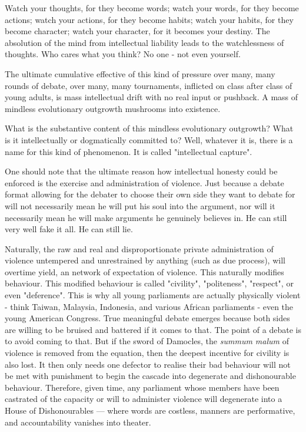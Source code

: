 \begin{itemize}
Watch your thoughts, for they become words; watch your words, for they become actions; watch your actions, for they become habits; watch your habits, for they become character; watch your character, for it becomes your destiny. The absolution of the mind from intellectual liability leads to the watchlessness of thoughts. Who cares what you think? No one - not even yourself. 
    
The ultimate cumulative effective of this kind of pressure over many, many rounds of debate, over many, many tournaments, inflicted on class after class of young adults, is mass intellectual drift with no real input or pushback. A mass of mindless evolutionary outgrowth mushrooms into existence. 

What is the substantive content of this mindless evolutionary outgrowth? What is it intellectually or dogmatically committed to? Well, whatever it is, there is a name for this kind of phenomenon. It is called "intellectual capture".

One should note that the ultimate reason how intellectual honesty could be enforced is the exercise and administration of violence. Just because a debate format allowing for the debater to choose their own side they want to debate for will not necessarily mean he will put his soul into the argument, nor will it necessarily mean he will make arguments he genuinely believes in. He can still very well fake it all. He can still lie. 

Naturally, the raw and real and disproportionate private administration of violence untempered and unrestrained by anything (such as due process), will overtime yield, an network of expectation of violence. This naturally modifies behaviour. This modified behaviour is called "civility", "politeness", "respect", or even "deference". This is why all young parliaments are actually physically violent - think Taiwan, Malaysia, Indonesia, and various African parliaments - even the young American Congress. True meaningful debate emerges because both sides are willing to be bruised and battered if it comes to that. The point of a debate is to avoid coming to that. But if the sword of Damocles, the \textit{summum malum} of violence is removed from the equation, then the deepest incentive for civility is also lost. It then only needs one defector to realise their bad behaviour will not be met with punishment to begin the cascade into degenerate and dishonourable behaviour. Therefore, given time, any parliament whose members have been castrated of the capacity or will to administer violence will degenerate into a House of Dishonourables — where words are costless, manners are performative, and accountability vanishes into theater.


\end{itemize}
